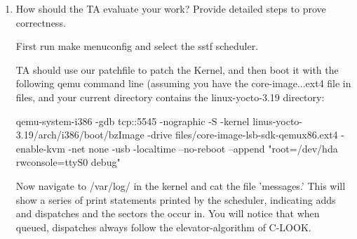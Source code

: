 \documentclass[letterpaper,10pt,fleqn]{article}
\begin{document}
\begin{enumerate}
\item How should the TA evaluate your work? Provide detailed steps to prove correctness.

First run make menuconfig and select the sstf scheduler.

TA should use our patchfile to patch the Kernel, and then boot it with the following qemu command line (assuming you have the core-image...ext4 file in files, and your current directory contains the linux-yocto-3.19 directory:

qemu-system-i386 -gdb tcp::5545 -nographic -S -kernel linus-yocto-3.19/arch/i386/boot/bzImage -drive files/core-image-lsb-sdk-qemux86.ext4 -enable-kvm -net none -usb -localtime --no-reboot --append "root=/dev/hda rwconsole=ttyS0 debug"

Now navigate to /var/log/ in the kernel and cat the file 'messages.' This will show a series of print statements printed by the scheduler, indicating adds and dispatches and the sectors the occur in. You will notice that when queued, dispatches always follow the elevator-algorithm of C-LOOK. 

\end{enumerate}

\begin{thebibliography}{9}

\end{thebibliography}
\end{document}
